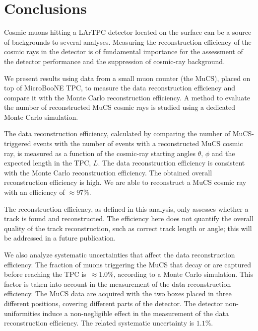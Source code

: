 \documentclass[a4paper,11pt]{article}
\begin{document}
\section{Conclusions}
Cosmic muons hitting a LArTPC detector located on the surface can be a source of backgrounds to several analyses. Measuring the reconstruction efficiency of the cosmic rays in the detector is of fundamental importance for the assessment of the detector performance and the suppression of cosmic-ray background.

We present results using data from a small muon counter (the MuCS), placed on top of MicroBooNE TPC, to measure the data reconstruction efficiency and compare it with the Monte Carlo reconstruction efficiency.
A method to evaluate the number of reconstructed MuCS cosmic rays is studied using a dedicated Monte Carlo simulation.

The data reconstruction efficiency, calculated by comparing the number of MuCS-triggered events with the number of events with a reconstructed MuCS cosmic ray, is measured as a function of the cosmic-ray starting angles $\theta$, $\phi$ and the expected length in the TPC, $L$. The data reconstruction efficiency is consistent with the Monte Carlo reconstruction efficiency. The obtained overall reconstruction efficiency is high. We are able to reconstruct a MuCS cosmic ray with an efficiency of $\approx97\%$.

The reconstruction efficiency, as defined in this analysis, only assesses whether a track is found and reconstructed. The efficiency here does not quantify the overall quality of the track reconstruction, such as correct track length or angle; this will be addressed in a future publication.

We also analyze systematic uncertainties that affect the data reconstruction efficiency. The fraction of muons triggering the MuCS that decay or are captured before reaching the TPC is~$\approx1.0\%$, according to a Monte Carlo simulation.  This factor is taken into account in the measurement of the data reconstruction efficiency.
The MuCS data are acquired with the two boxes placed in three different positions, covering different parts of the detector. The detector non-uniformities induce a non-negligible effect in the measurement of the data reconstruction efficiency. The related systematic uncertainty is $1.1\%$.
\end{document}

